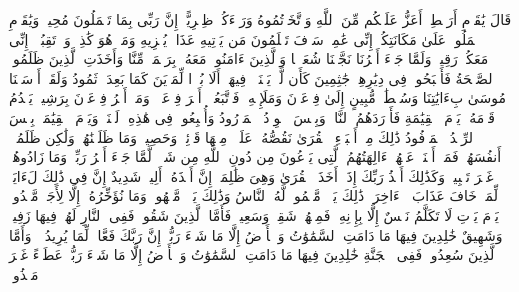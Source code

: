 \stopbuffer%
\startbuffer[\q:11:92]
قَالَ یَٰقَوۡمِ أَرَهۡطِیۤ أَعَزُّ عَلَیۡكُم مِّنَ ٱللَّهِ وَٱتَّخَذۡتُمُوهُ وَرَاۤءَكُمۡ ظِهۡرِیًّاۖ إِنَّ رَبِّی بِمَا تَعۡمَلُونَ مُحِیطࣱ%
\stopbuffer%
\startbuffer[\q:11:93]
وَیَٰقَوۡمِ ٱعۡمَلُوا۟ عَلَىٰ مَكَانَتِكُمۡ إِنِّی عَٰمِلࣱۖ سَوۡفَ تَعۡلَمُونَ مَن یَأۡتِیهِ عَذَابࣱ یُخۡزِیهِ وَمَنۡ هُوَ كَٰذِبࣱۖ وَٱرۡتَقِبُوۤا۟ إِنِّی مَعَكُمۡ رَقِیبࣱ%
\stopbuffer%
\startbuffer[\q:11:94]
وَلَمَّا جَاۤءَ أَمۡرُنَا نَجَّیۡنَا شُعَیۡبࣰا وَٱلَّذِینَ ءَامَنُوا۟ مَعَهُۥ بِرَحۡمَةࣲ مِّنَّا وَأَخَذَتِ ٱلَّذِینَ ظَلَمُوا۟ ٱلصَّیۡحَةُ فَأَصۡبَحُوا۟ فِی دِیَٰرِهِمۡ جَٰثِمِینَ%
\stopbuffer%
\startbuffer[\q:11:95]
كَأَن لَّمۡ یَغۡنَوۡا۟ فِیهَاۤۗ أَلَا بُعۡدࣰا لِّمَدۡیَنَ كَمَا بَعِدَتۡ ثَمُودُ%
\stopbuffer%
\startbuffer[\q:11:96]
وَلَقَدۡ أَرۡسَلۡنَا مُوسَىٰ بِءَایَٰتِنَا وَسُلۡطَٰنࣲ مُّبِینٍ%
\stopbuffer%
\startbuffer[\q:11:97]
إِلَىٰ فِرۡعَوۡنَ وَمَلَإِی۟هِۦ فَٱتَّبَعُوۤا۟ أَمۡرَ فِرۡعَوۡنَۖ وَمَاۤ أَمۡرُ فِرۡعَوۡنَ بِرَشِیدࣲ%
\stopbuffer%
\startbuffer[\q:11:98]
یَقۡدُمُ قَوۡمَهُۥ یَوۡمَ ٱلۡقِیَٰمَةِ فَأَوۡرَدَهُمُ ٱلنَّارَۖ وَبِئۡسَ ٱلۡوِرۡدُ ٱلۡمَوۡرُودُ%
\stopbuffer%
\startbuffer[\q:11:99]
وَأُتۡبِعُوا۟ فِی هَٰذِهِۦ لَعۡنَةࣰ وَیَوۡمَ ٱلۡقِیَٰمَةِۚ بِئۡسَ ٱلرِّفۡدُ ٱلۡمَرۡفُودُ%
\stopbuffer%
\startbuffer[\q:11:100]
ذَٰلِكَ مِنۡ أَنۢبَاۤءِ ٱلۡقُرَىٰ نَقُصُّهُۥ عَلَیۡكَۖ مِنۡهَا قَاۤئِمࣱ وَحَصِیدࣱ%
\stopbuffer%
\startbuffer[\q:11:101]
وَمَا ظَلَمۡنَٰهُمۡ وَلَٰكِن ظَلَمُوۤا۟ أَنفُسَهُمۡۖ فَمَاۤ أَغۡنَتۡ عَنۡهُمۡ ءَالِهَتُهُمُ ٱلَّتِی یَدۡعُونَ مِن دُونِ ٱللَّهِ مِن شَیۡءࣲ لَّمَّا جَاۤءَ أَمۡرُ رَبِّكَۖ وَمَا زَادُوهُمۡ غَیۡرَ تَتۡبِیبࣲ%
\stopbuffer%
\startbuffer[\q:11:102]
وَكَذَٰلِكَ أَخۡذُ رَبِّكَ إِذَاۤ أَخَذَ ٱلۡقُرَىٰ وَهِیَ ظَٰلِمَةٌۚ إِنَّ أَخۡذَهُۥۤ أَلِیمࣱ شَدِیدٌ%
\stopbuffer%
\startbuffer[\q:11:103]
إِنَّ فِی ذَٰلِكَ لَءَایَةࣰ لِّمَنۡ خَافَ عَذَابَ ٱلۡءَاخِرَةِۚ ذَٰلِكَ یَوۡمࣱ مَّجۡمُوعࣱ لَّهُ ٱلنَّاسُ وَذَٰلِكَ یَوۡمࣱ مَّشۡهُودࣱ%
\stopbuffer%
\startbuffer[\q:11:104]
وَمَا نُؤَخِّرُهُۥۤ إِلَّا لِأَجَلࣲ مَّعۡدُودࣲ%
\stopbuffer%
\startbuffer[\q:11:105]
یَوۡمَ یَأۡتِ لَا تَكَلَّمُ نَفۡسٌ إِلَّا بِإِذۡنِهِۦۚ فَمِنۡهُمۡ شَقِیࣱّ وَسَعِیدࣱ%
\stopbuffer%
\startbuffer[\q:11:106]
فَأَمَّا ٱلَّذِینَ شَقُوا۟ فَفِی ٱلنَّارِ لَهُمۡ فِیهَا زَفِیرࣱ وَشَهِیقٌ%
\stopbuffer%
\startbuffer[\q:11:107]
خَٰلِدِینَ فِیهَا مَا دَامَتِ ٱلسَّمَٰوَٰتُ وَٱلۡأَرۡضُ إِلَّا مَا شَاۤءَ رَبُّكَۚ إِنَّ رَبَّكَ فَعَّالࣱ لِّمَا یُرِیدُ%
\stopbuffer%
\startbuffer[\q:11:108]
۞ وَأَمَّا ٱلَّذِینَ سُعِدُوا۟ فَفِی ٱلۡجَنَّةِ خَٰلِدِینَ فِیهَا مَا دَامَتِ ٱلسَّمَٰوَٰتُ وَٱلۡأَرۡضُ إِلَّا مَا شَاۤءَ رَبُّكَۖ عَطَاۤءً غَیۡرَ مَجۡذُوذࣲ%
\stopbuffer%
\startbuffer[\q:11:109]
